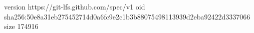 version https://git-lfs.github.com/spec/v1
oid sha256:50e8a31eb275452714d0a6fc9e2c1b3b88075498113939d2eba92422d3337066
size 174916
